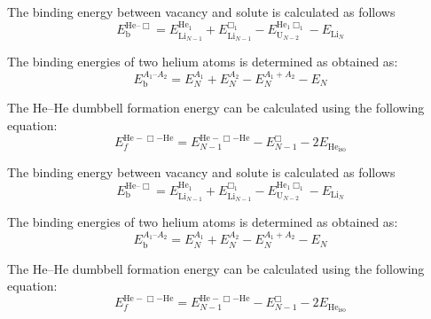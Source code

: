 \documentclass[aps,prl,amsmath,amssymb,reprint]{revtex4-1}
\begin{document}
The binding energy between vacancy and solute is calculated as follows
\begin{equation}\label{eq_binde}
 E_\text{b}^{\mathrm{He}\text{--}\Box} = E^{\mathrm{He}_1}_{\mathrm{Li}_{N-1}} + E^{\Box_1}_{\mathrm{Li}_{N-1}}- E^{\mathrm{He}_1\Box_1}_{\mathrm{U}_{N-2}} - E_{\mathrm{Li}_N}
\end{equation}

The binding energies of two helium atoms is determined as obtained as: 
\begin{equation}
E_{\text{b}}^{A_1\text{--}A_2} = E_N^{A_1} + E_N^{A_2} - E_N^{A_1+A_2} - E_N 
\end{equation}

The He--He dumbbell formation energy can be calculated using the following equation:
\begin{equation}\label{eq_dmbl}
E_{f}^{\text{He}-\Box-\text{He}} = E_{N-1}^{\text{He}-\Box-\text{He}} - E_{N-1}^{\Box} - 2E_{\text{He}_{\text{iso}}}
\end{equation}

The binding energy between vacancy and solute is calculated as follows
\begin{equation}\label{eq_binde}
 E_\text{b}^{\mathrm{He}\text{--}\Box} = E^{\mathrm{He}_1}_{\mathrm{Li}_{N-1}} + E^{\Box_1}_{\mathrm{Li}_{N-1}}- E^{\mathrm{He}_1\Box_1}_{\mathrm{U}_{N-2}} - E_{\mathrm{Li}_N}
\end{equation}

The binding energies of two helium atoms is determined as obtained as: 
\begin{equation}
E_{\text{b}}^{A_1\text{--}A_2} = E_N^{A_1} + E_N^{A_2} - E_N^{A_1+A_2} - E_N 
\end{equation}

The He--He dumbbell formation energy can be calculated using the following equation:
\begin{equation}\label{eq_dmbl}
E_{f}^{\text{He}-\Box-\text{He}} = E_{N-1}^{\text{He}-\Box-\text{He}} - E_{N-1}^{\Box} - 2E_{\text{He}_{\text{iso}}}
\end{equation}
\end{document}
